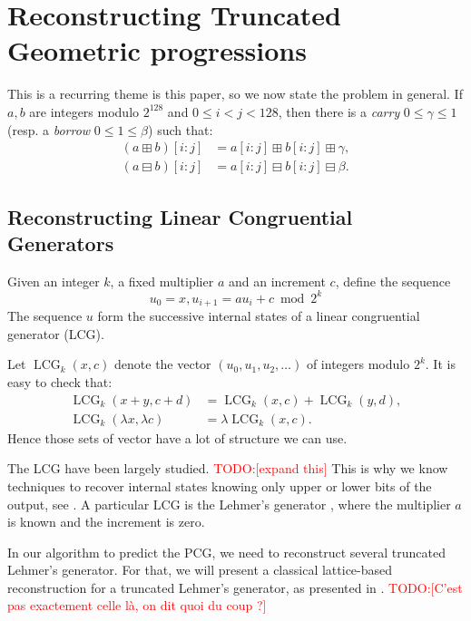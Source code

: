 \documentclass[preprint,svgnames]{iacrtrans}
\DeclareMathOperator{\LCG}{LCG}
\newcommand{\todo}[1]{\textcolor{red}{TODO:[#1]}}
\begin{document}
\section{Reconstructing Truncated Geometric progressions}
\label{sec:geometric}


This is a recurring theme is this paper, so we now state the problem in
general. If $a, b$ are integers modulo $2^{128}$ and $0\leq i<j<128$, then there
is a \emph{carry} $0 \leq \gamma \leq 1$ (resp. a \emph{borrow}
$0 \leq 1 \leq \beta$) such that:
\begin{align}
  (a \boxplus b)[i:j]  &= a[i:j] \boxplus  b[i:j] \boxplus  \gamma, \label{eq:caryy}  \\
  (a \boxminus b)[i:j] &= a[i:j] \boxminus b[i:j] \boxminus \beta.  \label{eq:borrow}
\end{align}

\subsection{Reconstructing Linear Congruential Generators}

Given an integer \(k\), a fixed multiplier \(a\) and an increment \(c\), define the
sequence \[u_0 = x, u_{i+1} = a u_i + c \bmod 2^k\] The sequence \(u\) form the
successive internal states of a linear congruential generator (LCG). 

Let $\LCG_{k}(x, c)$ denote the vector $(u_0, u_1, u_2, \dots)$ of integers
modulo $2^k$.  It is easy to check that:
\begin{align}
\label{eq:lcg-additive}
\LCG_{k}(x + y, c + d) &= \LCG_{k}(x, c) + \LCG_{k}(y, d),  \\
\label{eq:lcg-scalar}
\LCG_{k}(\lambda x, \lambda c) &= \lambda \LCG_{k}(x, c).   
\end{align}
Hence those sets of vector have a lot of structure we can use.

The LCG have been largely studied. \todo{expand this} This is why we know techniques to recover internal states knowing only upper or lower bits of the output, see \cite{Boyar1989}. A particular LCG is the Lehmer's generator \cite{Lehmer}, where the multiplier \(a\) is known and the increment is zero.

In our algorithm to predict the PCG, we need to reconstruct several truncated Lehmer's generator. For that, we will present a classical lattice-based reconstruction for a truncated Lehmer's generator, as presented in \cite{Frieze}. \todo{C'est pas exactement celle là, on dit quoi du coup ?}
\end{document}
